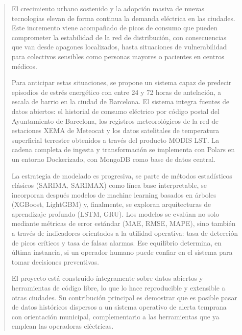 \documentclass[12pt, a4paper]{article}
\begin{document}
\begin{abstract}
El crecimiento urbano sostenido y la adopción masiva de nuevas tecnologías elevan de forma continua la demanda eléctrica en las ciudades. Este incremento viene acompañado de picos de consumo que pueden comprometer la estabilidad de la red de distribución, con consecuencias que van desde apagones localizados, hasta situaciones de vulnerabilidad para colectivos sensibles como personas mayores o pacientes en centros médicos.

Para anticipar estas situaciones, se propone un sistema capaz de predecir episodios de estrés energético con entre 24 y 72 horas de antelación, a escala de barrio en la ciudad de Barcelona. El sistema integra fuentes de datos abiertos: el historial de consumo eléctrico por código postal del Ayuntamiento de Barcelona, los registros meteorológicos de la red de estaciones XEMA de Meteocat y los datos satelitales de temperatura superficial terrestre obtenidos a través del producto MODIS LST. La cadena completa de ingesta y transformación se implementa con Polars en un entorno Dockerizado, con MongoDB como base de datos central.

La estrategia de modelado es progresiva, se parte de métodos estadísticos clásicos (SARIMA, SARIMAX) como línea base interpretable, se incorporan después modelos de machine learning basados en árboles (XGBoost, LightGBM) y, finalmente, se exploran arquitecturas de aprendizaje profundo (LSTM, GRU). Los modelos se evalúan no solo mediante métricas de error estándar (MAE, RMSE, MAPE), sino también a través de indicadores orientados a la utilidad operativa: tasa de detección de picos críticos y tasa de falsas alarmas. Ese equilibrio determina, en última instancia, si un operador humano puede confiar en el sistema para tomar decisiones preventivas.

El proyecto está construido íntegramente sobre datos abiertos y herramientas de código libre, lo que lo hace reproducible y extensible a otras ciudades. Su contribución principal es demostrar que es posible pasar de datos históricos dispersos a un sistema operativo de alerta temprana con orientación municipal, complementario a las herramientas que ya emplean las operadoras eléctricas.
\end{abstract}

\newpage
\end{document}
